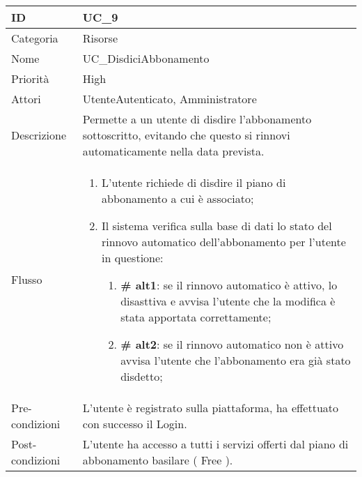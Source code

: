 \begin{center}
\begin{tabular}{ |p{2cm}|p{13cm}|  }
\hline
ID & UC\_9 \\\hline
Categoria & Risorse\\\hline
Nome & UC\_DisdiciAbbonamento\\\hline
Priorità & High \\\hline
Attori &  UtenteAutenticato, Amministratore \\\hline
Descrizione & Permette a un utente di disdire l'abbonamento sottoscritto, evitando che questo si rinnovi automaticamente nella data prevista.\\\hline
Flusso &  	\begin{enumerate}
			\item L'utente richiede di disdire il piano di abbonamento a cui è associato;
			\item Il sistema verifica sulla base di dati lo stato del rinnovo automatico dell'abbonamento per l'utente in questione:
			\begin{enumerate}[  ]
				\item \textbf{\# alt1}: se il rinnovo automatico è attivo, lo disasttiva e avvisa l'utente che la modifica è stata apportata correttamente;
				\item \textbf{\# alt2}: se il rinnovo automatico non è attivo avvisa l'utente che l'abbonamento era già stato disdetto;
			\end{enumerate}
		\end{enumerate}\\\hline
Pre-condizioni & L'utente è registrato sulla piattaforma, ha effettuato con successo il Login.\\\hline
Post-condizioni &  L'utente ha accesso a tutti i servizi offerti dal piano di abbonamento basilare ( Free ).\\\hline
\end{tabular}
\label{table_use_case:9}\newline


\end{center}
